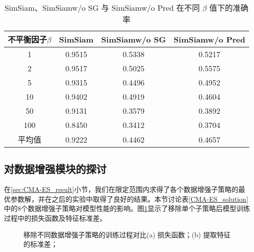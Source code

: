 \documentclass[master]{thesis-uestc}
\begin{document}
\begin{table}[h]
    \caption{SimSiam、SimSiamw/o SG 与 SimSiamw/o Pred 在不同 $\beta$ 值下的准确率}
    \centering
    \begin{tabular}{cccc}
    \toprule
    不平衡因子$\beta$  & SimSiam & SimSiamw/o SG & SimSiamw/o Pred \\
    \midrule
    1   & 0.9515  & 0.5338  & 0.5217 \\
    2   & 0.9517  & 0.5025  & 0.5575 \\
    5   & 0.9315  & 0.4496  & 0.4952 \\
    10  & 0.9402  & 0.4919  & 0.4604 \\
    50  & 0.9131  & 0.3579  & 0.3892 \\
    100 & 0.8450  & 0.3412  & 0.3704 \\
    \midrule
    平均值 & 0.9222  & 0.4462  & 0.4657 \\
    \bottomrule
    \end{tabular}
    \label{simsiam_vs_simsiamwosg_wopred}
\end{table}


\subsection{对数据增强模块的探讨}
在\ref{sec:CMA-ES_result}小节，我们在限定范围内求得了各个数据增强子策略的最优参数解，并在之后的实验中取得了良好的结果。本节讨论表\ref{CMA-ES_solution}中的8个数据增强子策略对模型性能的影响。图\ref{train_process_da_discuss}显示了移除单个子策略后模型训练过程中的损失函数及特征标准差。
\begin{figure}
    \centering
    \caption{移除不同数据增强子策略的训练过程对比(a) 损失函数；(b) 提取特征的标准差；}
    \label{train_process_da_discuss}
\end{figure}
\end{document}
